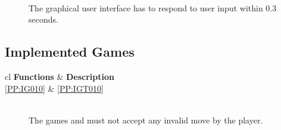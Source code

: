 \vspace{.5cm}

\begin{description}
	\item[] \textbf{} \\
	The graphical user interface has to respond to user input within 0.3 seconds.
\end{description}


\subsection{Implemented Games}

\begin{tabular}{{c}{l}}
    \hline
    {\bf Functions} & {\bf Description} \\ \hline
	\ref{PP:IG010} & \ref{PP:IGT010} \\ \hline
\end{tabular}

\begin{description}
	\item[] \textbf{} \\
	The games \twixt and \graphcoloring must not accept any invalid move by the player.
\end{description}